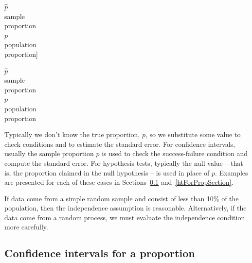 $\hat{p}$\vspace{0mm}\\\footnotesize sample\\proportion\vspace{3mm}\\\normalsize$p$\vspace{0mm}\\\footnotesize population\\proportion]{\raggedright\vspace{-53mm}

$\hat{p}$\vspace{0mm}\\\footnotesize sample\\proportion\vspace{3mm}\\\normalsize$p$\vspace{0mm}\\\footnotesize population\\proportion}

Typically we don't know the true proportion, $p$, so we substitute some value to check conditions and to estimate the standard error. For confidence intervals, usually the sample proportion $\hat{p}$ is used to check the success-failure condition and compute the standard error. For hypothesis tests, typically the null value -- that is, the proportion claimed in the null hypothesis -- is used in place of $p$. Examples are presented for each of these cases in Sections~\ref{confIntForPropSection} and~\ref{htForPropSection}.

\begin{tipBox}{
If data come from a simple random sample and consist of less than 10\% of the population, then the independence assumption is reasonable. Alternatively, if the data come from a random process, we must evaluate the independence condition more carefully.}
\end{tipBox}



\subsection{Confidence intervals for a proportion}
\label{confIntForPropSection}



